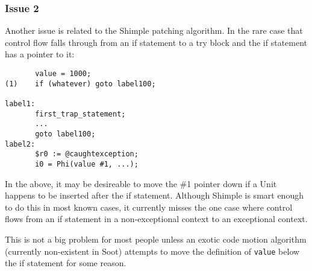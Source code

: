 \documentclass[10pt,letterpaper,oneside,onecolumn]{article}
\begin{document}
\subsubsection{Issue 2}

Another issue is related to the Shimple patching algorithm.  In the
rare case that control flow falls through from an if statement to a
try block and the if statement has a pointer to it:

\begin{verbatim}
       value = 1000;
(1)    if (whatever) goto label100;

label1:
       first_trap_statement;
       ...
       goto label100;
label2:
       $r0 := @caughtexception;
       i0 = Phi(value #1, ...);
\end{verbatim}

In the above, it may be desireable to move the \#1 pointer down if a
Unit happens to be inserted after the if statement.  Although Shimple
is smart enough to do this in most known cases, it currently misses
the one case where control flows from an if statement in a
non-exceptional context to an exceptional context.

This is not a big problem for most people unless an exotic code motion
algorithm (currently non-existent in Soot) attempts to move the
definition of {\tt value} below the if statement for some reason.
\end{document}
